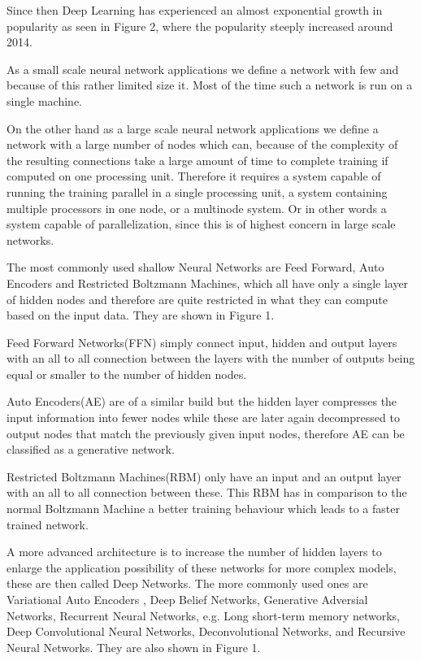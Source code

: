 \documentclass[conference]{IEEEtran}
\begin{document}
Since then Deep Learning has experienced an almost exponential growth in popularity as seen in Figure 2, where the popularity steeply increased around 2014.


As a small scale neural network applications we define a network with few and because of this rather limited size it. Most of the time such a network is run on a single machine.



On the other hand as a large scale neural network applications we define a network with a large number of nodes which can, because of the complexity of the resulting connections take a large amount of time to complete training if computed on one processing unit. Therefore it requires a system capable of running the training parallel in a single processing unit, a system containing multiple processors in one node, or a multinode system. Or in other words a system capable of parallelization, since this is of highest concern in large scale networks.


The most commonly used shallow Neural Networks are Feed Forward, Auto Encoders and Restricted Boltzmann Machines, which all have only a single layer of hidden nodes and therefore are quite restricted in what they can compute based on the input data. They are shown in Figure 1.

Feed Forward Networks(FFN) simply connect input, hidden and output layers with an all to all connection between the layers with the number of outputs being equal or smaller to the number of hidden nodes.

Auto Encoders(AE) are of a similar build but the hidden layer compresses the input information into fewer nodes while these are later again decompressed to output nodes that match the previously given input nodes, therefore AE can be classified as a generative network.

Restricted Boltzmann Machines(RBM) only have an input and an output layer with an all to all connection between these. This RBM has in comparison to the normal Boltzmann Machine a better training behaviour which leads to a faster trained network.

A more advanced architecture is to increase the number of hidden layers to enlarge the application possibility of these networks for more complex models, these are then called Deep Networks. The more commonly used ones are Variational Auto Encoders , Deep Belief Networks, Generative Adversial Networks, Recurrent Neural Networks, e.g. Long short-term memory networks, Deep Convolutional Neural Networks, Deconvolutional Networks, and Recursive Neural Networks. They are also shown in Figure 1.
\end{document}
